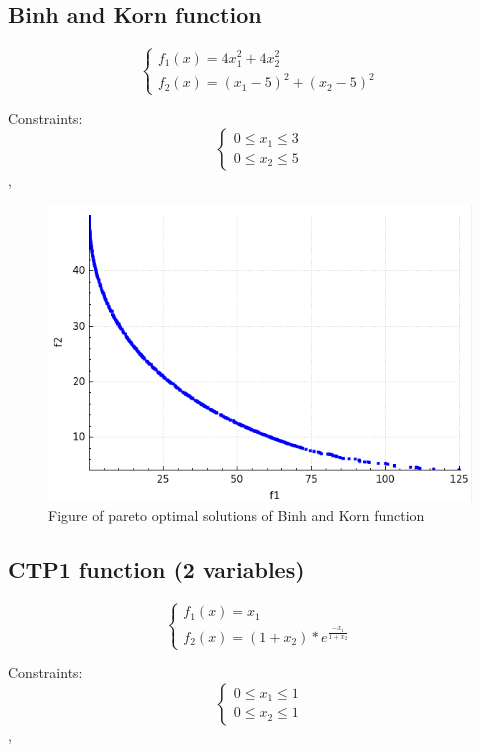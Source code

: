 \documentclass[a4paper, 11pt]{article}
\begin{document}
	\subsection{Binh and Korn function}
	$$\begin{cases}
		f_{1}(x)=4x_{1}^{2}+4x_{2}^{2}\\
		f_{2}(x)=(x_{1}-5)^{2}+(x_{2}-5)^{2}
	\end{cases}$$
		
	Constraints:
	$$\begin{cases}
		0 \leq x_{1} \leq 3\\
		0 \leq x_{2} \leq 5
	\end{cases}$$,

	\begin{figure}[H]
	\centering
	\includegraphics[scale=0.4]{binh_korn}
	\caption{Figure of pareto optimal solutions of Binh and Korn function}
	\label{fig:binh_korn}
	\end{figure}
	
	\subsection{CTP1 function (2 variables)}
	$$\begin{cases}
		f_{1}(x)=x_{1}\\
		f_{2}(x)=(1+x_{2})*e^{\frac{-x_{1}}{1+x_{2}}}
	\end{cases}$$
		
	Constraints:
	$$\begin{cases}
		0 \leq x_{1} \leq 1\\
		0 \leq x_{2} \leq 1
	\end{cases}$$,
	
\end{document}

